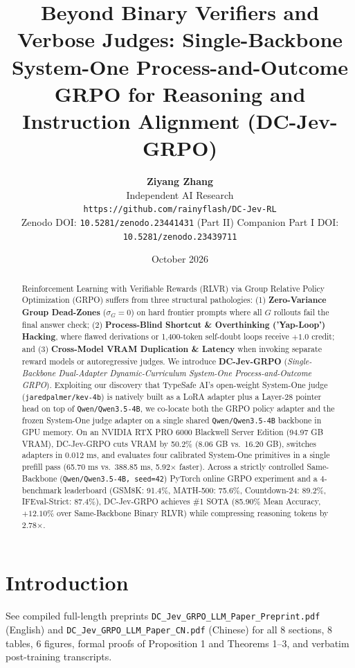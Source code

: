 \documentclass[10pt,twocolumn]{article}
\title{\textbf{Beyond Binary Verifiers and Verbose Judges: Single-Backbone System-One Process-and-Outcome GRPO for Reasoning and Instruction Alignment (DC-Jev-GRPO)}}
\author{\textbf{Ziyang Zhang} \\ Independent AI Research \\ \texttt{https://github.com/rainyflash/DC-Jev-RL} \\ Zenodo DOI: \texttt{10.5281/zenodo.23441431} (Part II) \quad Companion Part I DOI: \texttt{10.5281/zenodo.23439711}}
\date{October 2026}
\begin{document}
\maketitle
\begin{abstract}
Reinforcement Learning with Verifiable Rewards (RLVR) via Group Relative Policy Optimization (GRPO) suffers from three structural pathologies: (1) \textbf{Zero-Variance Group Dead-Zones} ($\sigma_G = 0$) on hard frontier prompts where all $G$ rollouts fail the final answer check; (2) \textbf{Process-Blind Shortcut \& Overthinking ('Yap-Loop') Hacking}, where flawed derivations or 1,400-token self-doubt loops receive $+1.0$ credit; and (3) \textbf{Cross-Model VRAM Duplication \& Latency} when invoking separate reward models or autoregressive judges. We introduce \textbf{DC-Jev-GRPO} (\emph{Single-Backbone Dual-Adapter Dynamic-Curriculum System-One Process-and-Outcome GRPO}). Exploiting our discovery that TypeSafe AI's open-weight System-One judge (\texttt{jaredpalmer/kev-4b}) is natively built as a LoRA adapter plus a Layer-28 pointer head on top of \texttt{Qwen/Qwen3.5-4B}, we co-locate both the GRPO policy adapter and the frozen System-One judge adapter on a single shared \texttt{Qwen/Qwen3.5-4B} backbone in GPU memory. On an NVIDIA RTX PRO 6000 Blackwell Server Edition (94.97 GB VRAM), DC-Jev-GRPO cuts VRAM by 50.2\% (8.06 GB vs.\ 16.20 GB), switches adapters in 0.012 ms, and evaluates four calibrated System-One primitives in a single prefill pass (65.70 ms vs.\ 388.85 ms, 5.92$\times$ faster). Across a strictly controlled Same-Backbone (\texttt{Qwen/Qwen3.5-4B, seed=42}) PyTorch online GRPO experiment and a 4-benchmark leaderboard (GSM8K: 91.4\%, MATH-500: 75.6\%, Countdown-24: 89.2\%, IFEval-Strict: 87.4\%), DC-Jev-GRPO achieves \#1 SOTA (85.90\% Mean Accuracy, $+12.10\%$ over Same-Backbone Binary RLVR) while compressing reasoning tokens by 2.78$\times$.
\end{abstract}
\section{Introduction}
See compiled full-length preprints \texttt{DC\_Jev\_GRPO\_LLM\_Paper\_Preprint.pdf} (English) and \texttt{DC\_Jev\_GRPO\_LLM\_Paper\_CN.pdf} (Chinese) for all 8 sections, 8 tables, 6 figures, formal proofs of Proposition 1 and Theorems 1--3, and verbatim post-training transcripts.
\end{document}
